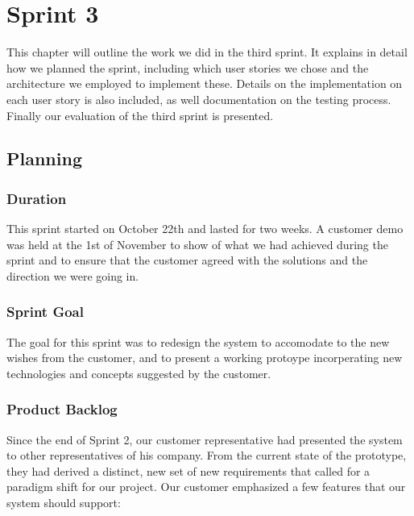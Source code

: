 \chapter{Sprint 3}

\minitoc

This chapter will outline the work we did in the third sprint. It explains in detail how we planned the sprint, including which user stories we chose and the architecture we employed to implement these. Details on the implementation on each user story is also included, as well documentation on the testing process. Finally our evaluation of the third sprint is presented. 

\clearpage

\section{Planning}

\subsection{Duration}
This sprint started on October 22th and lasted for two weeks. A customer demo was held at the 1st of November to show of what we had achieved during the sprint and to ensure that the customer agreed with the solutions and the direction we were going in.

\subsection{Sprint Goal}
The goal for this sprint was to redesign the system to accomodate to the new wishes from the customer, and to present a working protoype incorperating new technologies and concepts suggested by the customer.

\subsection{Product Backlog}
Since the end of Sprint 2, our customer representative had presented the system to other representatives of his company. From the current state of the prototype, they had derived a distinct, new set of new requirements that called for a paradigm shift for our project. Our customer emphasized a few features that our system should support:

